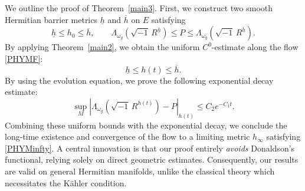 \documentclass[12pt, reqno]{amsart}
\theoremstyle{plain}
\theoremstyle{definition}
\renewcommand{\>}{\rightarrow}
\renewcommand{\>}{\rightarrow}
\newcommand{\om}{\omega}
\numberwithin{equation}{section} %
\begin{document}
\noindent We outline the proof of Theorem~\ref{main3}. First, we construct two smooth Hermitian barrier metrics $\underline{h}$ and $\overline{h}$ on $E$ satisfying
\begin{equation}
\underline{h} \leq h_0 \leq \overline{h}, \qquad
\Lambda_{\om_g}\left(\sqrt{-1}\, R^{\underline{h}}\right) \leq P \leq \Lambda_{\om_g}\left(\sqrt{-1}\, R^{\overline{h}}\right).
\end{equation}
By applying Theorem~\ref{main2}, we obtain the uniform $C^0$-estimate along the flow \eqref{PHYMF}:
\begin{equation}
\underline{h} \leq h(t) \leq \overline{h}.
\end{equation}
By using the evolution equation, we prove  the following exponential decay estimate:
\begin{equation}
\sup_M \left|\Lambda_{\omega_g}\left(\sqrt{-1}\, R^{h(t)}\right) - P\right|_{h(t)} \leq C_{2} e^{-C_1 t}.
\end{equation}
Combining these uniform bounds with the exponential decay, we conclude the long-time existence and convergence of the flow to a limiting metric $h_\infty$ satisfying \eqref{PHYMinfty}. A central innovation is that our proof entirely \emph{avoids} Donaldson's functional, relying solely on direct geometric estimates. Consequently, our results are valid on general Hermitian manifolds, unlike the classical theory which necessitates the K\"ahler condition.\\
\end{document}
